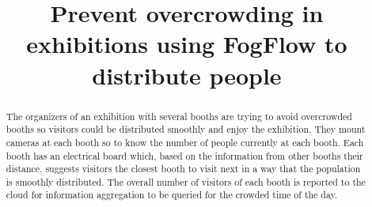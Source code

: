 \documentclass[conference]{ieeeconf}
\title{\LARGE \bf
    Prevent overcrowding in exhibitions using FogFlow to distribute people
}
\author{\IEEEauthorblockN{Lorenzo Siega Battel}
    \IEEEauthorblockA{lorenzo.siega@mail.polimi.it}}
\begin{document}
    \maketitle
    \thispagestyle{empty}
    \pagestyle{empty}

    \begin{abstract}

        The organizers of an exhibition with several booths are trying to avoid overcrowded booths so visitors could be distributed smoothly and enjoy the exhibition. They mount cameras at each booth so to know the number of people currently at each booth. Each booth has an electrical board which, based on the information from other booths their distance, suggests visitors the closest booth to visit next in a way that the population is smoothly distributed. The overall number of visitors of each booth is reported to the cloud for information aggregation to be queried for the crowded time of the day.

    \end{abstract}
\end{document}
